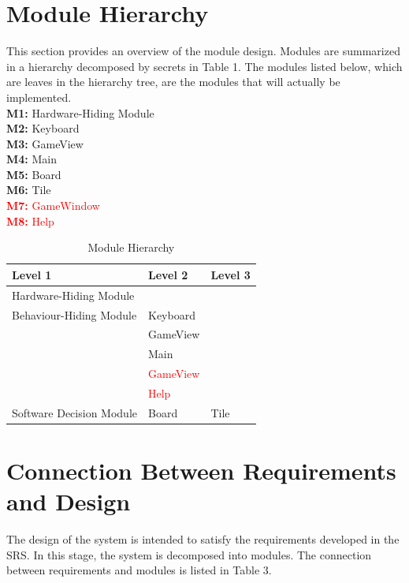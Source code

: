 \documentclass[12pt]{article}
\begin{document}
\section{Module Hierarchy}
This section provides an overview of the module design. Modules are summarized 
in a hierarchy decomposed by secrets in Table 1. The modules listed below, 
which are leaves in the hierarchy tree, are the modules that will actually be 
implemented.\bigskip\\
\textbf{M1:} Hardware-Hiding Module \\
\textbf{M2:} Keyboard \\
\textbf{M3:} GameView\\
\textbf{M4:} Main\\
\textbf{M5:} Board\\
\textbf{M6:} Tile\\
\textcolor{red}{\textbf{M7:} GameWindow}\\
\textcolor{red}{\textbf{M8:} Help}\\

\begin{table}[!htbp]
	\centering
	\begin{tabular}{p{5cm}|p{4cm}|p{4cm}}
		\textbf{Level 1} & \textbf{Level 2} & \textbf{Level 3} \\\hline
		Hardware-Hiding Module & \\\hline
		Behaviour-Hiding Module & Keyboard & \\
		& GameView & \\
		& Main & \\
		& \textcolor{red}{GameView} & \\
		& \textcolor{red}{Help} & \\\hline
		Software Decision Module & Board & Tile\\\hline
		
	\end{tabular}
	\smallskip
	\caption{Module Hierarchy}
	\label{Module Hierarchy}	
\end{table}

\section{Connection Between Requirements and Design}
The design of the system is intended to satisfy the requirements developed in the SRS. In this stage, the system is decomposed into modules. The connection between requirements and modules is listed in Table 3.
\end{document}
